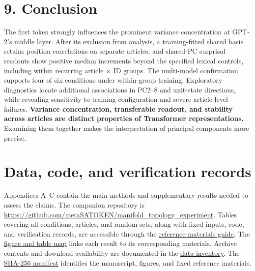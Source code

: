 \FloatBarrier

\section{9. Conclusion}\label{conclusion}

The first token strongly influences the prominent variance concentration at GPT-2's middle layer. After its exclusion from analysis, a training-fitted shared basis retains position correlations on separate articles, and shared-PC surprisal readouts show positive median increments beyond the specified lexical controls, including within recurring article × ID groups. The multi-model confirmation supports four of six conditions under within-group training. Exploratory diagnostics locate additional associations in PC2--8 and unit-state directions, while revealing sensitivity to training configuration and severe article-level failures. \textbf{Variance concentration, transferable readout, and stability across articles are distinct properties of Transformer representations.} Examining them together makes the interpretation of principal components more precise.

\FloatBarrier

\section{Data, code, and verification records}\label{data-code-and-verification-records}

Appendices A--C contain the main methods and supplementary results needed to assess the claims. The companion repository is \url{https://github.com/metaSATOKEN/manifold_topology_experiment}. Tables covering all conditions, articles, and random sets, along with fixed inputs, code, and verification records, are accessible through the \href{https://github.com/metaSATOKEN/manifold_topology_experiment/blob/main/references/README.md}{reference-materials guide}. The \href{https://github.com/metaSATOKEN/manifold_topology_experiment/blob/main/references/FIGURE_TABLE_MAP.md}{figure and table map} links each result to its corresponding materials. Archive contents and download availability are documented in the \href{https://github.com/metaSATOKEN/manifold_topology_experiment/blob/main/references/DATA.md}{data inventory}. The \href{https://github.com/metaSATOKEN/manifold_topology_experiment/blob/main/references/MANIFEST.json}{SHA-256 manifest} identifies the manuscript, figures, and fixed reference materials.

